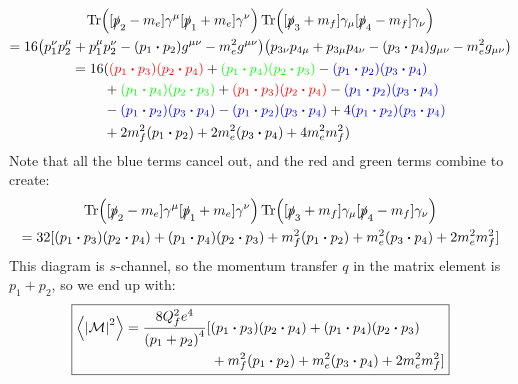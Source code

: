 \documentclass[12pt]{article}
\newcommand{\sla}{\slashed}
\newcommand{\M}{\mathcal{M}}
\begin{document}
\begin{gather*}
  \Tr([\sla{p}_2-m_e]\gamma^\mu[\sla{p}_1+m_e]\gamma^\nu)
  \Tr([\sla{p}_3+m_f]\gamma_\mu[\sla{p}_4-m_f]\gamma_\nu)\\
  =16\qty(p_1^\nu p_2^\mu+p_1^\mu p_2^\nu
  -(p_1\vdot p_2)g^{\mu\nu}-m_e^2g^{\mu\nu})
  \qty(p_{3\nu} p_{4\mu}+p_{3\mu} p_{4\nu}
  -(p_3\vdot p_4)g_{\mu\nu}-m_e^2g_{\mu\nu})\\
  \begin{aligned}
    =16&(
    {\color{red}(p_1\vdot p_3)(p_2\vdot p_4)}
    +{\color{green}(p_1\vdot p_4)(p_2\vdot p_3)}
    -{\color{blue}(p_1\vdot p_2)(p_3\vdot p_4)}\\
    &+{\color{green}(p_1\vdot p_4)(p_2\vdot p_3)}
    +{\color{red}(p_1\vdot p_3)(p_2\vdot p_4)}
    -{\color{blue}(p_1\vdot p_2)(p_3\vdot p_4)}\\
    &-{\color{blue}(p_1\vdot p_2)(p_3\vdot p_4)}
    -{\color{blue}(p_1\vdot p_2)(p_3\vdot p_4)}
    +{\color{blue}4(p_1\vdot p_2)(p_3\vdot p_4)}\\
    &+2m_f^2(p_1\vdot p_2)+2m_e^2(p_3\vdot p_4)+4m_e^2m_f^2
    )
  \end{aligned}
\end{gather*}
Note that all the blue terms cancel out, and the red and green terms combine to create:
\begin{gather*}
  \Tr([\sla{p}_2-m_e]\gamma^\mu[\sla{p}_1+m_e]\gamma^\nu)
  \Tr([\sla{p}_3+m_f]\gamma_\mu[\sla{p}_4-m_f]\gamma_\nu)\\
  =32[(p_1\vdot p_3)(p_2\vdot p_4)+(p_1\vdot p_4)(p_2\vdot p_3)
  +m_f^2(p_1\vdot p_2)+m_e^2(p_3\vdot p_4)
  +2m_e^2m_f^2
  ]
\end{gather*}
This diagram is $s$-channel, so the momentum transfer $q$ in the matrix element is $p_1+p_2$, so we end up with:
\begin{equation}
  \label{eq:p4}
  \boxed{
    \begin{aligned}
      \ev{\abs{\M}^2}=\frac{8Q_f^2e^4}{{(p_1+p_2)}^4}
      [&(p_1\vdot p_3)(p_2\vdot p_4)+(p_1\vdot p_4)(p_2\vdot p_3)\\
      &+m_f^2(p_1\vdot p_2)+m_e^2(p_3\vdot p_4)+2m_e^2m_f^2]
    \end{aligned}
  }
\end{equation}
\end{document}

